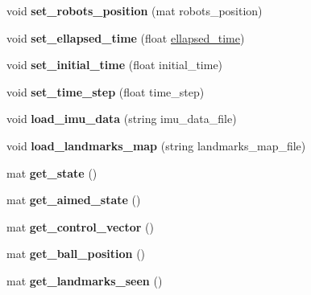 \begin{DoxyCompactItemize}
void {\bfseries set\+\_\+robots\+\_\+position} (mat robots\+\_\+position)
\item 
\mbox{\label{class_robot_navigation_acad092d28f0af0069de026b6e9459e45}} 
void {\bfseries set\+\_\+ellapsed\+\_\+time} (float \hyperlink{class_robot_navigation_a4ccd950c2d302318d4635263096bc977}{ellapsed\+\_\+time})
\item 
\mbox{\label{class_robot_navigation_ad4127e6135f10fefffd0524e5cf224e3}} 
void {\bfseries set\+\_\+initial\+\_\+time} (float initial\+\_\+time)
\item 
\mbox{\label{class_robot_navigation_a5f47abc9fd8fe81c2d4df33cd732a84a}} 
void {\bfseries set\+\_\+time\+\_\+step} (float time\+\_\+step)
\item 
\mbox{\label{class_robot_navigation_af1ec4d21b09907e7c849ab603a173484}} 
void {\bfseries load\+\_\+imu\+\_\+data} (string imu\+\_\+data\+\_\+file)
\item 
\mbox{\label{class_robot_navigation_af936fdf445213270848a4fc881d1cdb7}} 
void {\bfseries load\+\_\+landmarks\+\_\+map} (string landmarks\+\_\+map\+\_\+file)
\item 
\mbox{\label{class_robot_navigation_a3ecd5c2f6f316b4b41b48cb0c28a944e}} 
mat {\bfseries get\+\_\+state} ()
\item 
\mbox{\label{class_robot_navigation_aa56d5bc1153358167a4ea2521050a0b9}} 
mat {\bfseries get\+\_\+aimed\+\_\+state} ()
\item 
\mbox{\label{class_robot_navigation_a825a8172dc71450817593b0dcd6c6dc2}} 
mat {\bfseries get\+\_\+control\+\_\+vector} ()
\item 
\mbox{\label{class_robot_navigation_ab04ff3cecd3441e13588f1a2c78f4e2c}} 
mat {\bfseries get\+\_\+ball\+\_\+position} ()
\item 
\mbox{\label{class_robot_navigation_acc50daa5ac82e2900f87d2b312afc518}} 
mat {\bfseries get\+\_\+landmarks\+\_\+seen} ()

\end{DoxyCompactItemize}
